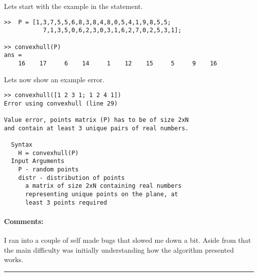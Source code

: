 Lets start with the example in the statement.

\begin{verbatim}
>>  P = [1,3,7,5,5,6,8,3,8,4,8,0,5,4,1,9,8,5,5;
           7,1,3,5,0,6,2,3,0,3,1,6,2,7,0,2,5,3,1];

>> convexhull(P)
ans =
    16    17     6    14     1    12    15     5     9    16
\end{verbatim}

Lets now show an example error.

\begin{verbatim}
>> convexhull([1 2 3 1; 1 2 4 1])
Error using convexhull (line 29)

Value error, points matrix (P) has to be of size 2xN
and contain at least 3 unique pairs of real numbers.

  Syntax
	H = convexhull(P)
  Input Arguments
	P - random points
	distr - distribution of points
	  a matrix of size 2xN containing real numbers
      representing unique points on the plane, at
      least 3 points required
\end{verbatim}

\paragraph{Comments:}
I ran into a couple of self made bugs that slowed me down a bit.
Aside from that the main difficulty was initially understanding how the algorithm presented works.

\bigskip
\hrule

